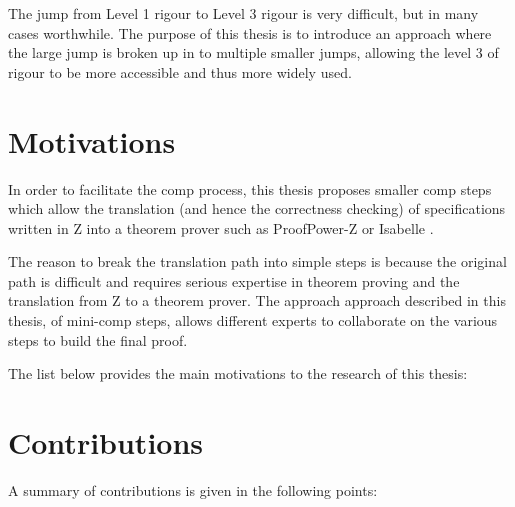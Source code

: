 The jump from Level 1 rigour to Level 3 rigour is very difficult, but in many cases worthwhile. The purpose of this thesis is to introduce an approach where the large jump is broken up in to multiple smaller jumps, allowing the level 3 of rigour to be more accessible and thus more widely used. 

\section{Motivations}

In order to facilitate the \gls{comp} process, this thesis proposes smaller \gls{comp} steps which allow the translation (and hence the correctness checking) of specifications written in Z into a theorem prover such as ProofPower-Z \cite{pp} or Isabelle \cite{isabelle}.

The reason to break the translation path into simple steps is because the original path is difficult and requires serious expertise in theorem proving and the translation from Z to a theorem prover. The approach approach described in this thesis, of mini-\gls{comp} steps, allows different experts to collaborate on the various steps to build the final proof.

The list below provides the main motivations to the research of this thesis:

\section{Contributions}

A summary of contributions is given in the following points:

